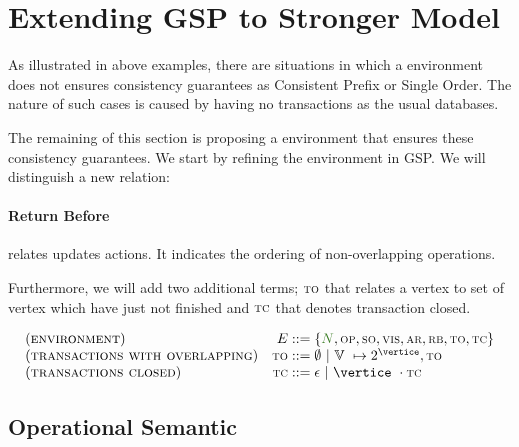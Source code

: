 \section{Extending GSP to Stronger Model}
\label{sec:transactions}

As illustrated in above examples, there are situations in which a environment does not ensures consistency guarantees as Consistent Prefix or Single Order. The nature of such cases is caused by having no transactions as the usual databases.

The remaining of this section is proposing a environment that ensures these consistency guarantees. We start by refining the environment in GSP. We will distinguish a new relation:

\paragraph{Return Before} relates updates actions. It indicates the ordering of non-overlapping operations. 

Furthermore, we will add two additional terms; $\textsc{\scriptsize{TO}}$ that relates a vertex to set of vertex which have just not finished and $\textsc{\scriptsize{TC}}$ that denotes transaction closed.


\[
    \begin{array}{l@{\quad}r@{\;::=\;}l}
			 (\textsc{environment}) & \environmentterm &  \environmenttran{\systemterm}{\op}{\so}{\vis}{\arb}{\rb}{\tx}{\tc} \\
			 (\textsc{transactions with overlapping}) & \tx &  \emptyset  \ | \ \verticesets\ \mapsto 2^{\vertice},\tx   \\
			 (\textsc{transactions closed}) & \tc &  \epsilon  \ | \ \vertice\ \cdot \tc 
	   \end{array}
\]


\subsection{Operational Semantic}




